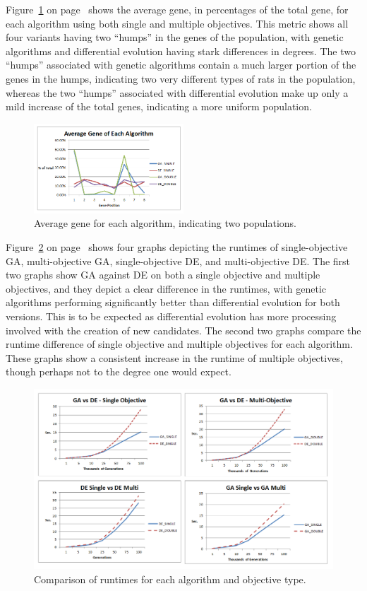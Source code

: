 \documentclass{sig-alternate}
\begin{document}
Figure~\ref{fig:avggene} on page~\pageref{fig:avggene} shows the average gene, in percentages of the total gene, for each algorithm using both single and multiple objectives.  This metric shows all four variants having two ``humps'' in the genes of the population, with genetic algorithms and differential evolution having stark differences in degrees.  The two ``humps'' associated with genetic algorithms contain a much larger portion of the genes in the humps, indicating two very different types of rats in the population, whereas the two ``humps'' associated with differential evolution make up only a mild increase of the total genes, indicating a more uniform population.

\begin{figure}
\centering
\includegraphics[width=0.5\textwidth]{avg_gene.png}
\caption{Average gene for each algorithm, indicating two populations.}
\label{fig:avggene}
\end{figure}

Figure~\ref{fig:runtimes} on page~\pageref{fig:runtimes} shows four graphs depicting the runtimes of single-objective GA, multi-objective GA, single-objective DE, and multi-objective DE.  The first two graphs show GA against DE on both a single objective and multiple objectives, and they depict a clear difference in the runtimes, with genetic algorithms performing significantly better than differential evolution for both versions.  This is to be expected as differential evolution has more processing involved with the creation of new candidates.  The second two graphs compare the runtime difference of single objective and multiple objectives for each algorithm.  These graphs show a consistent increase in the runtime of multiple objectives, though perhaps not to the degree one would expect.

\begin{figure}
\centering
\includegraphics[width=1.0\textwidth]{runtimes.png}
\caption{Comparison of runtimes for each algorithm and objective type.}
\label{fig:runtimes}
\end{figure}
\end{document}
